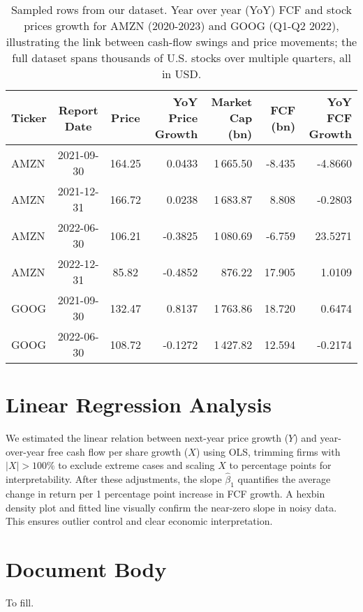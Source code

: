 \documentclass[11pt]{article}
\begin{document}
\begin{table*}[h]
  \setlength{\tabcolsep}{4pt}
  \centering
\caption{Sampled rows from our dataset. Year over year (YoY) FCF and stock prices growth for AMZN (2020-2023) and GOOG (Q1-Q2 2022), illustrating the link between cash-flow swings and price movements; the full dataset spans thousands of U.S. stocks over multiple quarters, all in USD.}
  \label{tab:sample-data}
  \begin{tabular}{lccrrrr}
    \toprule
    Ticker & Report Date & Price & YoY Price Growth & Market Cap (bn) & FCF (bn) & YoY FCF Growth \\
    \midrule
    AMZN & 2021-09-30 & 164.25 & 0.0433  & 1\,665.50 & -8.435 & -4.8660 \\
    AMZN & 2021-12-31 & 166.72 & 0.0238  & 1\,683.87 &  8.808 & -0.2803 \\
    AMZN & 2022-06-30 & 106.21 & -0.3825 & 1\,080.69 & -6.759 & 23.5271 \\
    AMZN & 2022-12-31 &  85.82 & -0.4852 &   876.22 & 17.905 &  1.0109 \\
    \midrule
    GOOG & 2021-09-30 & 132.47 & 0.8137  & 1\,763.86 & 18.720 &  0.6474 \\
    GOOG & 2022-06-30 & 108.72 & -0.1272 & 1\,427.82 & 12.594 & -0.2174 \\
    \bottomrule
  \end{tabular}
\end{table*}

\section{Linear Regression Analysis}

We estimated the linear relation between next-year price growth ($Y$) and year-over-year free cash flow per share growth ($X$) using OLS, trimming firms with $|X|>100\%$ to exclude extreme cases and scaling $X$ to percentage points for interpretability. After these adjustments, the slope $\hat\beta_1$ quantifies the average change in return per 1 percentage point increase in FCF growth. A hexbin density plot and fitted line visually confirm the near-zero slope in noisy data. This ensures outlier control and clear economic interpretation.

\section{Document Body}

To fill.
\end{document}
